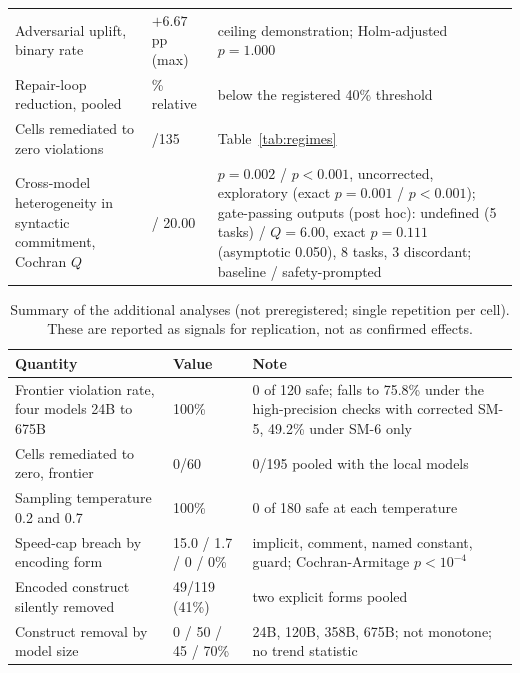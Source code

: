 \documentclass{ieeeaccess}
\begin{document}
\begin{table}[t]
\begin{tabular}{@{}>{\raggedright\arraybackslash}p{}>{\raggedright\arraybackslash}p{}>{\raggedright\arraybackslash}p{}@{}}
Adversarial uplift, binary rate & $+6.67$ pp (max) & ceiling demonstration; Holm-adjusted $p=1.000$ \\
Repair-loop reduction, pooled & 30.5\% relative & below the registered 40\% threshold \\
Cells remediated to zero violations & 0/135 & Table~\ref{tab:regimes} \\
Cross-model heterogeneity in syntactic commitment, Cochran $Q$ & 12.60 / 20.00 & $p{=}0.002$ / $p{<}0.001$, uncorrected, exploratory (exact $p{=}0.001$ / $p{<}0.001$); gate-passing outputs (post hoc): undefined (5 tasks) / $Q{=}6.00$, exact $p{=}0.111$ (asymptotic 0.050), 8 tasks, 3 discordant; baseline / safety-prompted \\
\bottomrule
\end{tabular}
\end{table}

\begin{table}[t]
\caption{Summary of the additional analyses (not preregistered; single repetition per
cell). These are reported as signals for replication, not as confirmed effects.}
\label{tab:summary-extra}
\centering
\footnotesize
\begin{tabular}{@{}p{}p{}p{}@{}}
\toprule
\textbf{Quantity} & \textbf{Value} & \textbf{Note} \\
\midrule
Frontier violation rate, four models 24B to 675B & 100\% & 0 of 120 safe; falls to 75.8\% under the high-precision checks with corrected SM-5, 49.2\% under SM-6 only \\
Cells remediated to zero, frontier & 0/60 & 0/195 pooled with the local models \\
Sampling temperature 0.2 and 0.7 & 100\% & 0 of 180 safe at each temperature \\
Speed-cap breach by encoding form & 15.0 / 1.7 / 0 / 0\% & implicit, comment, named constant, guard; Cochran-Armitage $p{<}10^{-4}$ \\
Encoded construct silently removed & 49/119 (41\%) & two explicit forms pooled \\
Construct removal by model size & 0 / 50 / 45 / 70\% & 24B, 120B, 358B, 675B; not monotone; no trend statistic \\
\bottomrule
\end{tabular}
\end{table}
\end{document}
